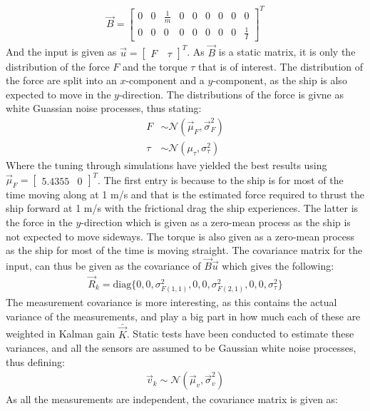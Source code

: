 \documentclass{ifacconf}
\begin{document}
\begin{align}
\vec{B} = \begin{bmatrix}
0 & 0 & \frac{1}{m} & 0 & 0 & 0 & 0 & 0 & 0\\
0 & 0 & 0 & 0 & 0 & 0 & 0 & 0 & \frac{1}{I} \end{bmatrix}^T
\end{align} 
And the input is given as $\vec{u} = \begin{bmatrix}F\ & \tau\end{bmatrix}^T$. As $\vec{B}$ is a static matrix, it is only the distribution of the force $F$ and the torque $\tau$ that is of interest. The distribution of the force are split into an $x$-component and a $y$-component, as the ship is also expected to move in the $y$-direction. The distributions of the force is givne as white Guassian noise processes, thus stating:
\begin{align}
F&\sim \mathcal{N}(\vec{\mu}_F,\vec{\sigma}^2_F)\\
\tau&\sim \mathcal{N}(\mu_\tau,\sigma^2_\tau)
\end{align}
Where the tuning through simulations have yielded the best results using $\vec{\mu}_F = \begin{bmatrix}5.4355 & 0\end{bmatrix}^T$. The first entry is because to the ship is for most of the time moving along at 1 m/s and that is the estimated force required to thrust the ship forward at 1 m/s with the frictional drag the ship experiences. The latter is the force in the $y$-direction which is given as a zero-mean process as the ship is not expected to move sideways. The torque is also given as a zero-mean process as the ship for most of the time is moving straight. The covariance matrix for the input, can thus be given as the covariance of $\vec{B}\vec{u}$ which gives the following:
\begin{align}
\vec{R}_k = \text{diag}\{0,0,\sigma^2_{F(1,1)},0,0,\sigma^2_{F(2,1)},0,0,\sigma^2_\tau\}
\end{align}
The measurement covariance is more interesting, as this contains the actual variance of the measurements, and play a big part in how much each of these are weighted in Kalman gain $\bar{\vec{K}}$. Static tests have been conducted to estimate these variances, and all the sensors are assumed to be Gaussian white noise processes, thus defining:
\begin{align}
\vec{v}_k  \sim \mathcal{N}(\vec{\mu}_v,\vec{\sigma}^2_{v})
\end{align}
As all the measurements are independent, the covariance matrix is given as:
\end{document}
